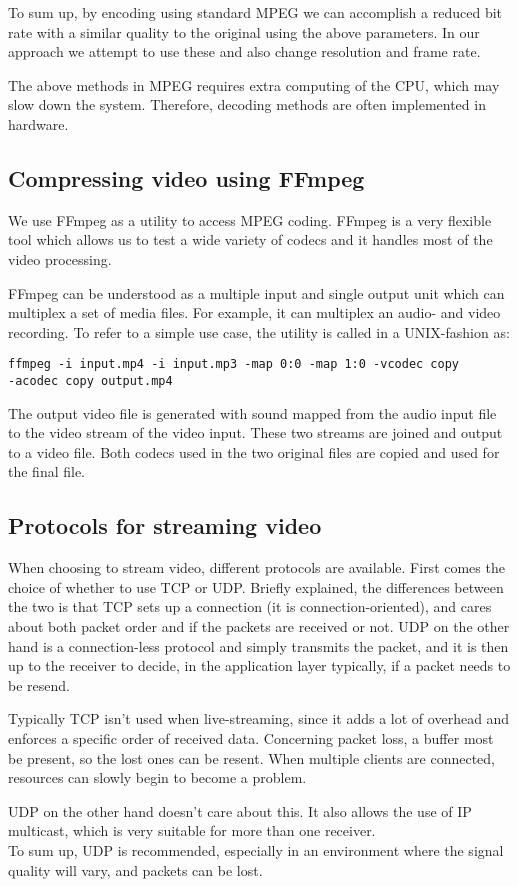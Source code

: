To sum up, by encoding using standard MPEG we can accomplish a reduced bit rate with a similar quality to the original using the above parameters. In our approach we attempt to use these and also change resolution and frame rate.

The above methods in MPEG requires extra computing of the CPU, which may slow down the system. Therefore, decoding methods are often implemented in hardware.

\subsection{Compressing video using FFmpeg}
We use FFmpeg as a utility to access MPEG coding. FFmpeg is a very flexible tool which allows us to test a wide variety of codecs and it handles most of the video processing.

FFmpeg can be understood as a multiple input and single output unit which can multiplex a set of media files. For example, it can multiplex an audio- and video recording. To refer to a simple use case, the utility is called in a UNIX-fashion as:
\begin{center}
\begin{verbatim}
ffmpeg -i input.mp4 -i input.mp3 -map 0:0 -map 1:0 -vcodec copy
-acodec copy output.mp4
\end{verbatim}
\end{center}
The output video file is generated with sound mapped from the audio input file to the video stream of the video input. These two streams are joined and output to a video file. Both codecs used in the two original files are copied and used for the final file.

\subsection{Protocols for streaming video}
When choosing to stream video, different protocols are available. First comes the choice of whether to use TCP or UDP. Briefly explained, the differences between the two is that TCP sets up a connection (it is connection-oriented), and cares about both packet order and if the packets are received or not. UDP on the other hand is a connection-less protocol and simply transmits the packet, and it is then up to the receiver to decide, in the application layer typically, if a packet needs to be resend.

Typically TCP isn't used when live-streaming, since it adds a lot of overhead and enforces a specific order of received data. Concerning packet loss, a buffer most be present, so the lost ones can be resent. When multiple clients are connected, resources can slowly begin to become a problem.

UDP on the other hand doesn't care about this. It also allows the use of IP multicast, which is very suitable for more than one receiver.\\

To sum up, UDP is recommended, especially in an environment where the signal quality will vary, and packets can be lost.
